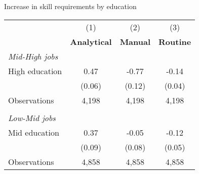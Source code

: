 \begin{center}
\begin{threeparttable}[!h]
\caption{Increase in skill requirements by education}
\label{tab:skillRegs}
\begin{tabular}{lccc}
\toprule
\toprule
&\multicolumn{1}{c}{(1)}&\multicolumn{1}{c}{(2)}&\multicolumn{1}{c}{(3)} \\
\textbf{}&\multicolumn{1}{c}{\textbf{Analytical}}&\multicolumn{1}{c}{\textbf{Manual}}&\multicolumn{1}{c}{\textbf{Routine}} \\
\midrule
\textit{Mid-High jobs } \\ 
High education      &        0.47\sym{***}&       -0.77\sym{***}&       -0.14\sym{**} \\
                    &      (0.06)         &      (0.12)         &      (0.04)         \\
\midrule Observations&       4,198         &       4,198         &       4,198         \\
\\
\textit{Low-Mid jobs  } \\
Mid education       &        0.37\sym{***}&       -0.05         &       -0.12\sym{*}  \\
                    &      (0.09)         &      (0.08)         &      (0.05)         \\
\midrule Observations&       4,858         &       4,858         &       4,858         \\
\bottomrule
\bottomrule
\end{tabular}
\end{threeparttable}
\end{center}
